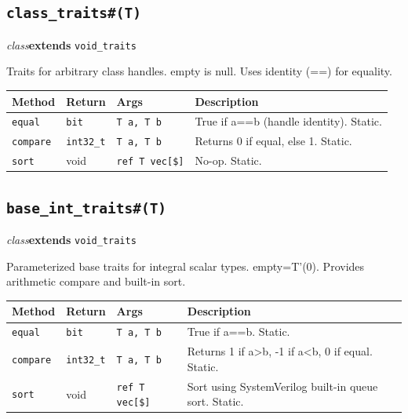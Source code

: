 \documentclass[11pt,letterpaper]{report}
\begin{document}
\subsection*{\texttt{class\_traits\#(T)}}
\noindent\small\textit{class}\quad \textbf{extends} \texttt{void\_traits}\par

Traits for arbitrary class handles. empty is null. Uses identity (==) for equality.

\begin{xltabular}{\linewidth}{>{\small}p{1.35in} >{\small}p{1.25in} >{\small}p{0.95in} >{\small}X}
\toprule
\textbf{Method} & \textbf{Return} & \textbf{Args} & \textbf{Description} \\
\midrule
\endhead
\bottomrule
\endfoot
\texttt{equal} & \texttt{bit} & \texttt{T a, T b} & True if a==b (handle identity). Static. \\
\texttt{compare} & \texttt{int32\_t} & \texttt{T a, T b} & Returns 0 if equal, else 1. Static. \\
\texttt{sort} & void & \texttt{ref T vec[\$]} & No-op. Static. \\
\end{xltabular}

\subsection*{\texttt{base\_int\_traits\#(T)}}
\noindent\small\textit{class}\quad \textbf{extends} \texttt{void\_traits}\par

Parameterized base traits for integral scalar types. empty=T'(0). Provides arithmetic compare and built-in sort.

\begin{xltabular}{\linewidth}{>{\small}p{1.35in} >{\small}p{1.25in} >{\small}p{0.95in} >{\small}X}
\toprule
\textbf{Method} & \textbf{Return} & \textbf{Args} & \textbf{Description} \\
\midrule
\endhead
\bottomrule
\endfoot
\texttt{equal} & \texttt{bit} & \texttt{T a, T b} & True if a==b. Static. \\
\texttt{compare} & \texttt{int32\_t} & \texttt{T a, T b} & Returns 1 if a\textgreater{}b, -1 if a\textless{}b, 0 if equal. Static. \\
\texttt{sort} & void & \texttt{ref T vec[\$]} & Sort using SystemVerilog built-in queue sort. Static. \\
\end{xltabular}
\end{document}
